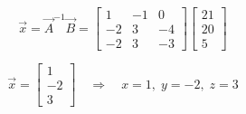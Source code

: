 \documentclass[journal]{IEEEtran}
\begin{document}
\[
\vec{x} = \vec{A}^{-1}\vec{B} =
\begin{bmatrix}
1 & -1 & 0 \\[4pt]
-2 & 3 & -4 \\[4pt]
-2 & 3 & -3
\end{bmatrix}
\begin{bmatrix}
21 \\[4pt]
20 \\[4pt]
5
\end{bmatrix}
\]

\[
\vec{x} =
\begin{bmatrix}
1 \\[4pt]
-2 \\[4pt]
3
\end{bmatrix}
\quad \Longrightarrow \quad
\boxed{x=1,\; y=-2,\; z=3}
\]
\end{document}
